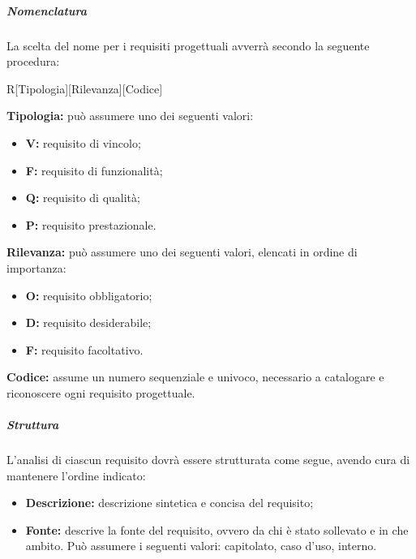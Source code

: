 			\subparagraph{Nomenclatura}
			La scelta del nome per i requisiti progettuali avverrà secondo la seguente procedura:
			\begin{center}
			R[Tipologia][Rilevanza][Codice]
			\end{center}
			\textbf{Tipologia:} può assumere uno dei seguenti valori:
			\begin{itemize}
				\item \textbf{V:} requisito di vincolo;
				\item \textbf{F:} requisito di funzionalità;
				\item \textbf{Q:} requisito di qualità;
				\item \textbf{P:} requisito prestazionale.
			\end{itemize}
			\textbf{Rilevanza:} può assumere uno dei seguenti valori, elencati in ordine di importanza:
			\begin{itemize}
				\item \textbf{O:} requisito obbligatorio;
				\item \textbf{D:} requisito desiderabile;
				\item \textbf{F:} requisito facoltativo.
			\end{itemize}
			\textbf{Codice:} assume un numero sequenziale e univoco, necessario a catalogare e riconoscere ogni requisito progettuale.
		
			\subparagraph{Struttura}
			L'analisi di ciascun requisito dovrà essere strutturata come segue, avendo cura di mantenere l'ordine indicato:
			\begin{itemize}
			  \item \textbf{Descrizione:} descrizione sintetica e concisa del requisito;
			  \item \textbf{Fonte:} descrive la fonte del requisito, ovvero da chi è stato sollevato e in che ambito. Può assumere i seguenti valori: capitolato, caso d'uso, interno.
			\end{itemize}
	
